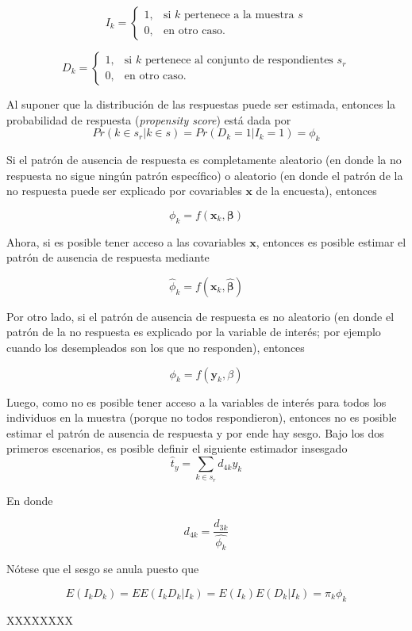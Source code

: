 \[
I_k=
\begin{cases}
1,  &\text{si $k$ pertenece a la muestra $s$}\\
0,  &\text{en otro caso.}
\end{cases}
\]

\[
D_k=
\begin{cases}
1,  &\text{si $k$ pertenece al conjunto de respondientes $s_r$}\\
0,  &\text{en otro caso.}
\end{cases}
\]

Al suponer que la distribución de las respuestas puede ser estimada, entonces la probabilidad de respuesta (\emph{propensity score}) está dada por
\[
Pr(k\in s_r|k\in s)=Pr(D_k = 1|I_k = 1)=\phi_k 
\]

Si el patrón de ausencia de respuesta es completamente aleatorio (en donde la no respuesta no sigue ningún patrón específico) o aleatorio (en donde el patrón de la no respuesta puede ser explicado por covariables \(\mathbf{x}\) de la encuesta), entonces

\[
\phi_k = f(\mathbf{x}_k, \boldsymbol{\beta})
\]

Ahora, si es posible tener acceso a las covariables \(\mathbf{x}\), entonces es posible estimar el patrón de ausencia de respuesta mediante

\[
\hat{\phi}_k = f(\mathbf{x}_k, \hat{\boldsymbol{\beta}})
\]

Por otro lado, si el patrón de ausencia de respuesta es no aleatorio (en donde el patrón de la no respuesta es explicado por la variable de interés; por ejemplo cuando los desempleados son los que no responden), entonces

\[
\phi_k = f(\mathbf{y}_k, \beta)
\]

Luego, como no es posible tener acceso a la variables de interés para todos los individuos en la muestra (porque no todos respondieron), entonces no es posible estimar el patrón de ausencia de respuesta y por ende hay sesgo. Bajo los dos primeros escenarios, es posible definir el siguiente estimador insesgado
\[
\hat{t}_y=\sum_{k\in s_r}d_{4k}y_k
\]

En donde

\[
d_{4k} = \frac{d_{3k}}{\hat{\phi_k}}
\]

Nótese que el sesgo se anula puesto que

\[
E(I_kD_k) 
= EE(I_kD_k|I_k) 
= E(I_k)E(D_k|I_k) = \pi_k \phi_k
\]

XXXXXXXX

